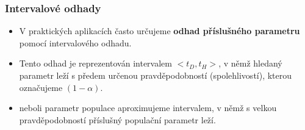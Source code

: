\subsubsection{Intervalové odhady}
\begin{itemize}
\item V praktických aplikacích často určujeme \textbf{odhad příslušného parametru} pomocí intervalového odhadu.
\item Tento odhad je reprezentován intervalem $<t_D, t_H>$, v němž hledaný parametr leží s předem určenou pravděpodobností (spolehlivostí), kterou označujeme $(1 − \alpha)$.
\item neboli parametr populace aproximujeme intervalem, v němž s velkou pravděpodobností příslušný populační parametr leží.
\end{itemize}

